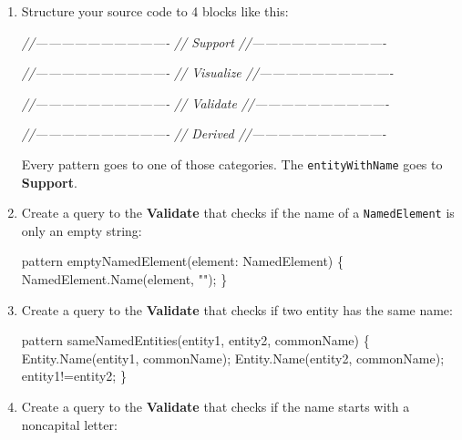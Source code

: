 \documentclass[]{report}
\newenvironment{Shaded}{}{}
\newcommand{\StringTok}[1]{\textcolor[rgb]{0.25,0.44,0.63}{{#1}}}
\newcommand{\CommentTok}[1]{\textcolor[rgb]{0.38,0.63,0.69}{\textit{{#1}}}}
\newcommand{\FunctionTok}[1]{\textcolor[rgb]{0.02,0.16,0.49}{{#1}}}
\newcommand{\NormalTok}[1]{{#1}}
\begin{document}
\begin{enumerate}
\def\labelenumi{\arabic{enumi}.}
\item
  Structure your source code to 4 blocks like this:

\begin{Shaded}
\begin{Highlighting}[]
\CommentTok{//-------------------------------}
\CommentTok{// Support}
\CommentTok{//-------------------------------}

\CommentTok{//-------------------------------}
\CommentTok{// Visualize}
\CommentTok{//-------------------------------}

\CommentTok{//-------------------------------}
\CommentTok{// Validate}
\CommentTok{//-------------------------------}

\CommentTok{//-------------------------------}
\CommentTok{// Derived}
\CommentTok{//-------------------------------}
\end{Highlighting}
\end{Shaded}

  Every pattern goes to one of those categories. The
  \texttt{entityWithName} goes to \textbf{Support}.
\item
  Create a query to the \textbf{Validate} that checks if the name of a
  \texttt{NamedElement} is only an empty string:

\begin{Shaded}
\begin{Highlighting}[]
\NormalTok{pattern }\FunctionTok{emptyNamedElement}\NormalTok{(element: NamedElement) \{}
    \NormalTok{NamedElement.}\FunctionTok{Name}\NormalTok{(element, }\StringTok{""}\NormalTok{);}
\NormalTok{\}}
\end{Highlighting}
\end{Shaded}
\item
  Create a query to the \textbf{Validate} that checks if two entity has
  the same name:

\begin{Shaded}
\begin{Highlighting}[]
\NormalTok{pattern }\FunctionTok{sameNamedEntities}\NormalTok{(entity1, entity2, commonName) \{}
    \NormalTok{Entity.}\FunctionTok{Name}\NormalTok{(entity1, commonName);}
    \NormalTok{Entity.}\FunctionTok{Name}\NormalTok{(entity2, commonName);}
    \NormalTok{entity1!=entity2;}
\NormalTok{\}}
\end{Highlighting}
\end{Shaded}
\item
  Create a query to the \textbf{Validate} that checks if the name starts
  with a noncapital letter:


\end{enumerate}
\end{document}
